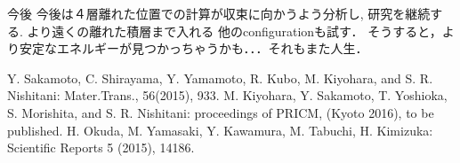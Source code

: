 \documentclass[a4j,twocolumn]{jsarticle}
\begin{document}
今後
今後は４層離れた位置での計算が収束に向かうよう分析し, 研究を継続する.
より遠くの離れた積層まで入れる
他のconfigurationも試す．
そうすると，より安定なエネルギーが見つかっちゃうかも．．．それもまた人生．

\begin{thebibliography}{9}
Y. Sakamoto, C. Shirayama, Y. Yamamoto, R. Kubo, M. Kiyohara, and S. R. Nishitani: Mater.Trans., 56(2015), 933.
 M. Kiyohara, Y. Sakamoto, T. Yoshioka, S. Morishita, and S. R. Nishitani: proceedings of PRICM, (Kyoto 2016), to be published.
 H. Okuda, M. Yamasaki, Y. Kawamura, M. Tabuchi, H. Kimizuka: Scientific Reports 5 (2015), 14186.
\end{thebibliography}
\end{document}
